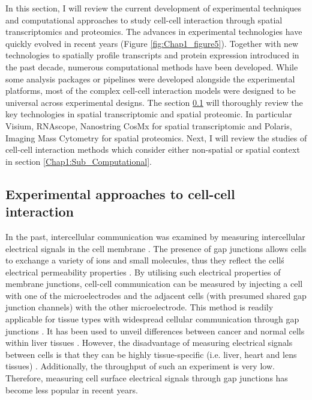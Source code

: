 In this section, I will review the current development of experimental techniques and computational approaches to study cell-cell interaction through spatial transcriptomics and proteomics. The advances in experimental technologies have quickly evolved in recent years (Figure \ref{fig:Chap1_figure5}). Together with new technologies to spatially profile transcripts and protein expression introduced in the past decade, numerous computational methods have been developed. While some analysis packages or pipelines were developed alongside the experimental platforms, most of the complex cell-cell interaction models were designed to be universal across experimental designs. The section \ref{Chap1:Sub_Spatial_Experiment_Platform} will thoroughly review the key technologies in spatial transcriptomic and spatial proteomic. In particular Visium, RNAscope, Nanostring CosMx for spatial transcriptomic and Polaris, Imaging Mass Cytometry for spatial proteomics. Next, I will review the studies of cell-cell interaction methods which consider either non-spatial or  spatial context in section \ref{Chap1:Sub_Computational}.                

\subsection{Experimental approaches to cell-cell interaction}
\label{Chap1:Sub_Spatial_Experiment_Platform}
In the past, intercellular communication was examined by measuring intercellular electrical signals in the cell membrane \cite{bennett1966physiology, loewenstein1967intercellular, de1982cell}. The presence of gap junctions allows cells to exchange a variety of ions and small molecules, thus they reflect the cell\'s electrical permeability properties \cite{penn1966ionic, bennett1966physiology,loewenstein1966permeability,loewenstein1974cellular}. By utilising such electrical properties of membrane junctions, cell-cell communication can be measured by injecting a cell with one of the microelectrodes and the adjacent cells (with presumed shared gap junction channels) with the other microelectrode. This method is readily applicable for tissue types with widespread cellular communication through gap junctions \cite{penn1966ionic}. It has been used to unveil differences between cancer and normal cells within liver tissues \cite{loewenstein1966intercellular, loewenstein1967intercellular}. However, the disadvantage of measuring electrical signals between cells is that they can be highly tissue-specific (i.e. liver, heart and lens tissues) \cite{gros1983comparative}. Additionally, the throughput of such an experiment is very low. Therefore, measuring cell surface electrical signals through gap junctions has become less popular in recent years. 

